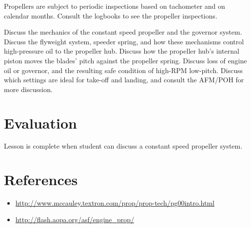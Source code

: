 \documentclass[twoside,openright]{report}
\begin{document}
Propellers are subject to periodic inspections based on tachometer and on
calendar months. Consult the logbooks to see the propeller inspections.

Discuss the mechanics of the constant speed propeller and the governor system.
Discuss the flyweight system, speeder spring, and how these mechanisms control
high-pressure oil to the propeller hub. Discuss how the propeller hub's
internal piston moves the blades' pitch against the propeller spring. Discuss
loss of engine oil or governor, and the resulting safe condition of high-RPM
low-pitch. Discuss which settings are ideal for take-off and landing, and
consult the AFM/POH for more discussion.

\section{Evaluation}

Lesson is complete when student can discuss a constant speed propeller system.

\section{References}

\begin{itemize}
  \item \url{http://www.mccauley.textron.com/prop/prop-tech/pg00intro.html}

  \item \url{http://flash.aopa.org/asf/engine_prop/}
\end{itemize}
\end{document}
